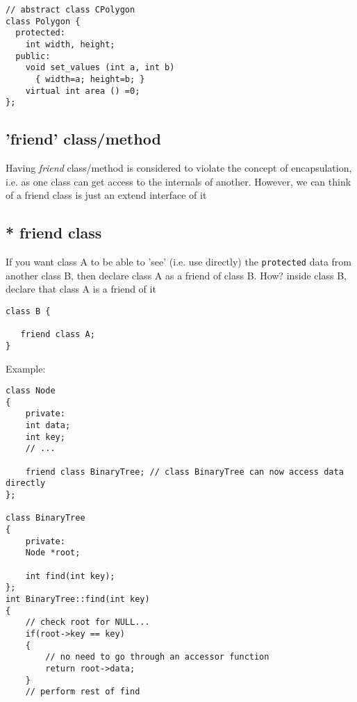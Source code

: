 \begin{Verbatim}
// abstract class CPolygon
class Polygon {
  protected:
    int width, height;
  public:
    void set_values (int a, int b)
      { width=a; height=b; }
    virtual int area () =0;
};
\end{Verbatim}

\subsection{'friend' class/method}
\label{sec:OO_friend-class_method}

Having {\it friend} class/method is considered to violate the concept of
encapsulation, i.e. as one class can get access to the internals of another.
However, we can think of a friend class is  just an extend interface of it

\subsection{* friend class}
\label{sec:OO_friend-class}

If you want class A to be able to 'see' (i.e. use directly) the
\verb!protected! data from another class B, then declare class A as a friend of
class B. How? inside class B, declare that class A is a friend of it
\begin{verbatim}
class B {

   friend class A;
}
\end{verbatim}


Example:
\begin{verbatim}
class Node 
{
    private: 
    int data;
    int key;
    // ...

    friend class BinaryTree; // class BinaryTree can now access data directly
};

class BinaryTree
{
    private:
    Node *root;

    int find(int key);
};
int BinaryTree::find(int key)
{
    // check root for NULL...
    if(root->key == key)
    {
        // no need to go through an accessor function
        return root->data;
    }
    // perform rest of find
\end{verbatim}

